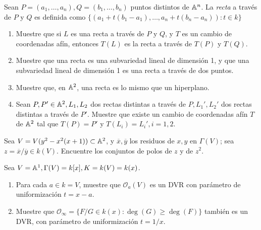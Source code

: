\begin{prob}{2.15}
    Sean \(P=(a_1,\dots ,a_n),Q=(b_1,\dots ,b_n)\) puntos distintos de \(\mathbb{A}^n\). La \textit{recta} a través de \(P\) y \(Q\) es definida como \(\{(a_1+t(b_1-a_1),\dots ,a_n+t(b_n-a_n)):t\in k\}\)
    \begin{enumerate}
        \item Muestre que si \(L\) es una recta a través de \(P\) y \(Q\), y \(T\) es un cambio de coordenadas afín, entonces \(T(L)\) es la recta a través de \(T(P)\) y \(T(Q)\).
        \item Muestre que una recta es una subvariedad lineal de dimensión 1, y que una subvariedad lineal de dimensión 1 es una recta a través de dos puntos.
        \item Muestre que, en \(\mathbb{A}^2\), una recta es lo mismo que un hiperplano.
        \item Sean \(P,P'\in\mathbb{A}^2,L_1,L_2\) dos rectas distintas a través de \(P,L_1',L_2'\) dos rectas distintas a través de \(P'\). Muestre que existe un cambio de coordenadas afín \(T\) de \(\mathbb{A}^2\) tal que \(T(P)=P'\) y \(T(L_i)=L_i',i=1,2\).
    \end{enumerate}
\end{prob}

\begin{sol}{2.15}

\end{sol}

\begin{prob}{2.17}
    Sea \(V=V(y^2-x^2(x+1))\subset\mathbb{A}^2\), y \(\overline{x},\overline{y}\) los residuos de \(x,y\) en \(\Gamma(V)\); sea \(z=\overline{x}/\overline{y}\in k(V)\). Encuentre los conjuntos de polos de \(z\) y de \(z^2\).
\end{prob}

\begin{sol}{2.17}

\end{sol}

\begin{prob}{2.24}
    Sea \(V=\mathbb{A}^1,\Gamma(V)=k[x],K=k(V)=k(x)\).
    \begin{enumerate}
        \item Para cada \(a\in k=V\), muestre que \(\mathcal{O}_a(V)\) es un DVR con parámetro de uniformización \(t=x-a\).
        \item Muestre que \(\mathcal{O}_\infty=\{F/G\in k(x):\deg(G)\geq\deg(F)\}\) también es un DVR, con parámetro de uniformización \(t=1/x\).
    \end{enumerate}
\end{prob}

